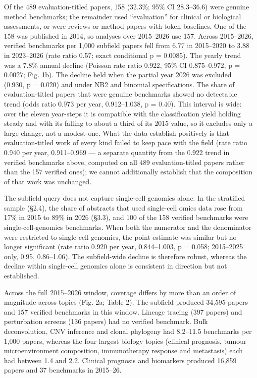 \documentclass[11pt]{article}
\begin{document}
Of the 489 evaluation-titled papers, 158 (32.3\%; 95\% CI 28.3--36.6)
were genuine method benchmarks; the remainder used ``evaluation'' for
clinical or biological assessments, or were reviews or method papers
with token baselines. One of the 158 was published in 2014, so analyses
over 2015--2026 use 157. Across 2015--2026, verified benchmarks per
1,000 subfield papers fell from 6.77 in 2015--2020 to 3.88 in 2023--2026
(rate ratio 0.57; exact conditional p = 0.0085). The yearly trend was a
7.8\% annual decline (Poisson rate ratio 0.922, 95\% CI 0.875--0.972, p
= 0.0027; Fig. 1b). The decline held when the partial year 2026 was
excluded (0.930, p = 0.020) and under NB2 and binomial specifications.
The share of evaluation-titled papers that were genuine benchmarks
showed no detectable trend (odds ratio 0.973 per year, 0.912--1.038, p =
0.40). This interval is wide: over the eleven year-steps it is
compatible with the classification yield holding steady and with its
falling to about a third of its 2015 value, so it excludes only a large
change, not a modest one. What the data establish positively is that
evaluation-titled work of every kind failed to keep pace with the field
(rate ratio 0.940 per year, 0.911--0.969 --- a separate quantity from
the 0.922 trend in verified benchmarks above, computed on all 489
evaluation-titled papers rather than the 157 verified ones); we cannot
additionally establish that the composition of that work was unchanged.

The subfield query does not capture single-cell genomics alone. In the
stratified sample (§2.4), the share of abstracts that used single-cell
omics data rose from 17\% in 2015 to 89\% in 2026 (§3.3), and 100 of the
158 verified benchmarks were single-cell-genomics benchmarks. When both
the numerator and the denominator were restricted to single-cell
genomics, the point estimate was similar but no longer significant (rate
ratio 0.920 per year, 0.844--1.003, p = 0.058; 2015--2025 only, 0.95,
0.86--1.06). The subfield-wide decline is therefore robust, whereas the
decline within single-cell genomics alone is consistent in direction but
not established.

Across the full 2015--2026 window, coverage differs by more than an
order of magnitude across topics (Fig. 2a; Table 2). The subfield
produced 34,595 papers and 157 verified benchmarks in this window.
Lineage tracing (397 papers) and perturbation screens (136 papers) had
no verified benchmark. Bulk deconvolution, CNV inference and clonal
phylogeny had 8.2--11.5 benchmarks per 1,000 papers, whereas the four
largest biology topics (clinical prognosis, tumour microenvironment
composition, immunotherapy response and metastasis) each had between 1.4
and 2.2. Clinical prognosis and biomarkers produced 16,859 papers and 37
benchmarks in 2015--26.
\end{document}
